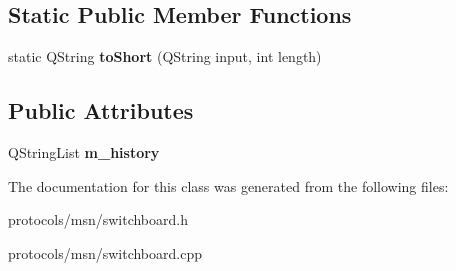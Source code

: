 \subsection*{Static Public Member Functions}
\begin{DoxyCompactItemize}
\item 
\hypertarget{classSwitchBoardSession_ad0b0421ed84df42ab33488a00ee752a8}{
static QString {\bfseries toShort} (QString input, int length)}
\label{classSwitchBoardSession_ad0b0421ed84df42ab33488a00ee752a8}

\end{DoxyCompactItemize}
\subsection*{Public Attributes}
\begin{DoxyCompactItemize}
\item 
\hypertarget{classSwitchBoardSession_ae3af3477e30a0b1c93424fb397a2f653}{
QStringList {\bfseries m\_\-history}}
\label{classSwitchBoardSession_ae3af3477e30a0b1c93424fb397a2f653}

\end{DoxyCompactItemize}


The documentation for this class was generated from the following files:\begin{DoxyCompactItemize}
\item 
protocols/msn/switchboard.h\item 
protocols/msn/switchboard.cpp\end{DoxyCompactItemize}
